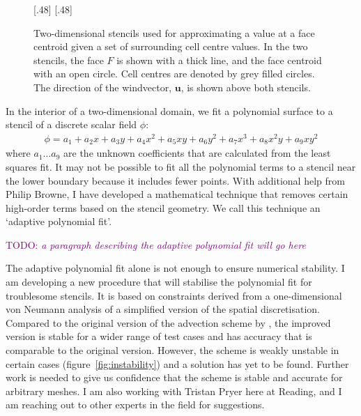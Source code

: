 \documentclass[a4paper,11pt]{article}
\newcommand{\TODO}[1]{\textcolor{purple}{TODO: \emph{#1}}}
\begin{document}
\begin{figure}
	\centering
	[.48\linewidth]{}
	[.48\linewidth]{\vspace*{2em}}
	\caption{Two-dimensional stencils used for approximating a value at a face centroid given a set of surrounding cell centre values.  In the two stencils, the face $F$ is shown with a thick line, and the face centroid with an open circle. Cell centres are denoted by grey filled circles.  The direction of the windvector, $\bm{u}$, is shown above both stencils.}
	\label{fig:stencils}
\end{figure}

In the interior of a two-dimensional domain, we fit a polynomial surface to a stencil of a discrete scalar field $\phi$:
\begin{align}
	\phi = a_1 + a_2 x + a_3 y + a_4 x^2 + a_5 x y + a_6 y^2 + a_7 x^3 + a_8 x^2 y + a_9 x y^2
\end{align}
where $a_1 \ldots a_9$ are the unknown coefficients that are calculated from the least squares fit.  It may not be possible to fit all the polynomial terms to a stencil near the lower boundary because it includes fewer points.  With additional help from Philip Browne, I have developed a mathematical technique that removes certain high-order terms based on the stencil geometry.  We call this technique an `adaptive polynomial fit'.

\TODO{a paragraph describing the adaptive polynomial fit will go here}

The adaptive polynomial fit alone is not enough to ensure numerical stability.  I am developing a new procedure that will stabilise the polynomial fit for troublesome stencils.  It is based on constraints derived from a one-dimensional von Neumann analysis of a simplified version of the spatial discretisation.  Compared to the original version of the advection scheme by \citet{weller-shahrokhi2014}, the improved version is stable for a wider range of test cases and has accuracy that is comparable to the original version.
However, the scheme is weakly unstable in certain cases (figure~\ref{fig:instability}) and a solution has yet to be found.
Further work is needed to give us confidence that the scheme is stable and accurate for arbitrary meshes.
I am also working with Tristan Pryer here at Reading, and I am reaching out to other experts in the field for suggestions.
\end{document}
